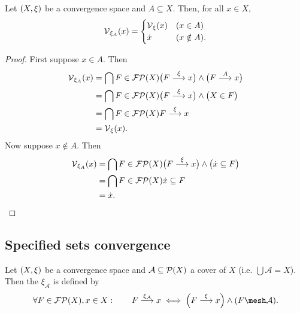 \begin{lemma} \label{specifiedPointsModificationVicinity}
Let $\sSet{X,\xi}$ be a convergence space and $A\subseteq X$. Then, for all $x\in X$,
\[ \operatorname{\mathcal{V}}_{\xi_A}(x) = \begin{cases}
\operatorname{\mathcal{V}}_\xi(x) & (x\in A) \\
\dot{x} & (x\notin A).
\end{cases} \]
\end{lemma}
\begin{proof}
First suppose $x\in A$. Then
\begin{align*}
\operatorname{\mathcal{V}}_{\xi_A}(x) &= \bigcap{F\in\operatorname{\mathcal{FP}}(X)}{\big(F\overset{\xi}{\longrightarrow} x\big) \land \big(F\overset{A}{\longrightarrow} x\big)} \\
&= \bigcap{F\in\operatorname{\mathcal{FP}}(X)}{\big(F\overset{\xi}{\longrightarrow} x\big) \land \big(X\in F\big)} \\
&= \bigcap{F\in\operatorname{\mathcal{FP}}(X)}{F\overset{\xi}{\longrightarrow} x} \\
&= \operatorname{\mathcal{V}}_\xi(x).
\end{align*}
Now suppose $x\notin A$. Then
\begin{align*}
\operatorname{\mathcal{V}}_{\xi_A}(x) &= \bigcap{F\in\operatorname{\mathcal{FP}}(X)}{\big(F\overset{\xi}{\longrightarrow} x\big) \land \big(\dot{x} \subseteq F\big)} \\
&= \bigcap{F\in\operatorname{\mathcal{FP}}(X)}{\dot{x} \subseteq F} \\
&= \dot{x}.
\end{align*}
\end{proof}

\subsection{Specified sets convergence}
\begin{definition}
Let $\sSet{X,\xi}$ be a convergence space and $\mathcal{A}\subseteq \operatorname{\mathcal{P}}(X)$ a cover of $X$ (i.e. $\bigcup \mathcal{A} = X$). Then the  $\xi_{\mathcal{A}}$ is defined by
\[ \forall F\in\powerfilters(X), x\in X: \qquad F\overset{\xi_{\mathcal{A}}}{\longrightarrow} x \iff \Big(F \overset{\xi}{\longrightarrow} x\Big) \land (F \mesh \mathcal{A}). \]
\end{definition}

